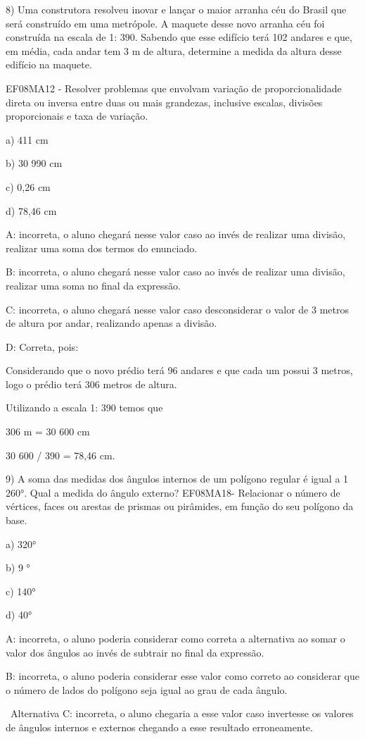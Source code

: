{8) Uma construtora resolveu inovar e lançar o maior arranha céu do
Brasil que será construído em uma metrópole. A maquete desse novo
arranha céu foi construída na escala de 1: 390. Sabendo que esse
edifício terá 102 andares e que, em média, cada andar tem 3 m de altura,
determine a medida da altura desse edifício na maquete.

EF08MA12 - Resolver problemas que envolvam variação de proporcionalidade
direta ou inversa entre duas ou mais grandezas, inclusive escalas,
divisões proporcionais e taxa de variação.

a) 411 cm

b) 30 990 cm

c) 0,26 cm

d) 78,46 cm

A: incorreta, o aluno chegará nesse valor caso ao invés de realizar uma
divisão, realizar uma soma dos termos do enunciado.

B: incorreta, o aluno chegará nesse valor caso ao invés de realizar uma
divisão, realizar uma soma no final da expressão.

C: incorreta, o aluno chegará nesse valor caso desconsiderar o valor de
3 metros de altura por andar, realizando apenas a divisão.

D: Correta, pois:

Considerando que o novo prédio terá 96 andares e que cada um possui 3
metros, logo o prédio terá 306 metros de altura.

Utilizando a escala 1: 390 temos que

306 m = 30 600 cm

30 600 / 390 = 78,46 cm.

9) A soma das medidas dos ângulos internos de um polígono regular é
igual a 1 260°. Qual a medida do ângulo externo? EF08MA18- Relacionar o
número de vértices, faces ou arestas de prismas ou pirâmides, em função
do seu polígono da base.

a) 320°

b) 9 °

c) 140°

d) 40°

A: incorreta, o aluno poderia considerar como correta a alternativa ao
somar o valor dos ângulos ao invés de subtrair no final da expressão.

B: incorreta, o aluno poderia considerar esse valor como correto ao
considerar que o número de lados do polígono seja igual ao grau de cada
ângulo.

~Alternativa C: incorreta, o aluno chegaria a esse valor caso invertesse
os valores de ângulos internos e externos chegando a esse resultado
erroneamente.

}
